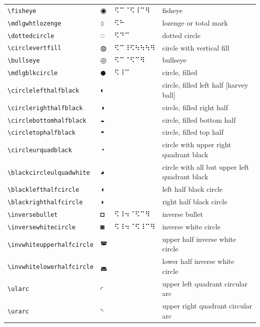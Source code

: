 \documentclass[oneside]{article}
\begin{document}
\begin{longtable}{llll}
\verb|\fisheye| & $\fisheye$ &  ⠫⠉⠈⠫⠸⠉⠻  & {fisheye} \\[2ex]
\verb|\mdlgwhtlozenge| & $\mdlgwhtlozenge$ &  ⠫⠓  & {lozenge or total mark} \\[2ex]
\verb|\dottedcircle| & $\dottedcircle$ &  ⠫⠙⠉  & {dotted circle} \\[2ex]
\verb|\circlevertfill| & $\circlevertfill$ &  ⠫⠉⠸⠫⠳⠳⠳⠻  & {circle with vertical fill} \\[2ex]
\verb|\bullseye| & $\bullseye$ &  ⠫⠉⠈⠫⠉⠻  & {bullseye} \\[2ex]
\verb|\mdlgblkcircle| & $\mdlgblkcircle$ &  ⠫⠸⠉  & {circle, filled} \\[2ex]
\verb|\circlelefthalfblack| & $\circlelefthalfblack$ &    & {circle, filled left half [harvey ball]} \\[2ex]
\verb|\circlerighthalfblack| & $\circlerighthalfblack$ &    & {circle, filled right half} \\[2ex]
\verb|\circlebottomhalfblack| & $\circlebottomhalfblack$ &    & {circle, filled bottom half} \\[2ex]
\verb|\circletophalfblack| & $\circletophalfblack$ &    & {circle, filled top half} \\[2ex]
\verb|\circleurquadblack| & $\circleurquadblack$ &    & {circle with upper right quadrant black} \\[2ex]
\verb|\blackcircleulquadwhite| & $\blackcircleulquadwhite$ &    & {circle with all but upper left quadrant black} \\[2ex]
\verb|\blacklefthalfcircle| & $\blacklefthalfcircle$ &    & {left half black circle} \\[2ex]
\verb|\blackrighthalfcircle| & $\blackrighthalfcircle$ &    & {right half black circle} \\[2ex]
\verb|\inversebullet| & $\inversebullet$ &  ⠫⠸⠲⠈⠫⠉⠻  & {inverse bullet } \\[2ex]
\verb|\inversewhitecircle| & $\inversewhitecircle$ &  ⠫⠸⠲⠈⠫⠸⠉⠻  & {inverse white circle} \\[2ex]
\verb|\invwhiteupperhalfcircle| & $\invwhiteupperhalfcircle$ &    & {upper half inverse white circle} \\[2ex]
\verb|\invwhitelowerhalfcircle| & $\invwhitelowerhalfcircle$ &    & {lower half inverse white circle} \\[2ex]
\verb|\ularc| & $\ularc$ &    & {upper left quadrant circular arc} \\[2ex]
\verb|\urarc| & $\urarc$ &    & {upper right quadrant circular arc} \\[2ex]

\end{longtable}
\end{document}
